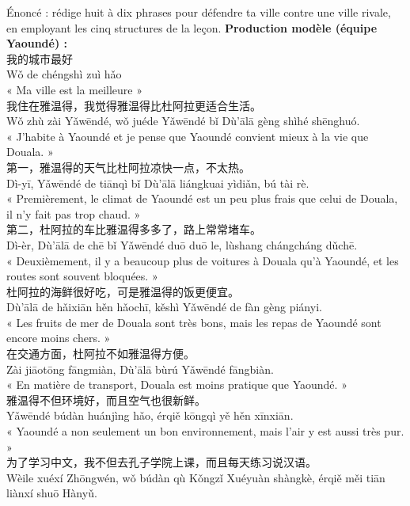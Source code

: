 \documentclass[11pt]{article}
\begin{document}
\begin{exoresolu}
Énoncé : rédige huit à dix phrases pour défendre ta ville contre une ville rivale, en employant les cinq structures de la leçon.
\tcblower
\textbf{Production modèle (équipe Yaoundé) :}\\[4pt]
我的城市最好\\
Wǒ de chéngshì zuì hǎo\\
« Ma ville est la meilleure »\\[4pt]
我住在雅温得，我觉得雅温得比杜阿拉更适合生活。\\
Wǒ zhù zài Yǎwēndé, wǒ juéde Yǎwēndé bǐ Dù'ālā gèng shìhé shēnghuó.\\
« J'habite à Yaoundé et je pense que Yaoundé convient mieux à la vie que Douala. »\\[4pt]
第一，雅温得的天气比杜阿拉凉快一点，不太热。\\
Dì-yī, Yǎwēndé de tiānqì bǐ Dù'ālā liángkuai yìdiǎn, bú tài rè.\\
« Premièrement, le climat de Yaoundé est un peu plus frais que celui de Douala, il n'y fait pas trop chaud. »\\[4pt]
第二，杜阿拉的车比雅温得多多了，路上常常堵车。\\
Dì-èr, Dù'ālā de chē bǐ Yǎwēndé duō duō le, lùshang chángcháng dǔchē.\\
« Deuxièmement, il y a beaucoup plus de voitures à Douala qu'à Yaoundé, et les routes sont souvent bloquées. »\\[4pt]
杜阿拉的海鲜很好吃，可是雅温得的饭更便宜。\\
Dù'ālā de hǎixiān hěn hǎochī, kěshì Yǎwēndé de fàn gèng piányi.\\
« Les fruits de mer de Douala sont très bons, mais les repas de Yaoundé sont encore moins chers. »\\[4pt]
在交通方面，杜阿拉不如雅温得方便。\\
Zài jiāotōng fāngmiàn, Dù'ālā bùrú Yǎwēndé fāngbiàn.\\
« En matière de transport, Douala est moins pratique que Yaoundé. »\\[4pt]
雅温得不但环境好，而且空气也很新鲜。\\
Yǎwēndé búdàn huánjìng hǎo, érqiě kōngqì yě hěn xīnxiān.\\
« Yaoundé a non seulement un bon environnement, mais l'air y est aussi très pur. »\\[4pt]
为了学习中文，我不但去孔子学院上课，而且每天练习说汉语。\\
Wèile xuéxí Zhōngwén, wǒ búdàn qù Kǒngzǐ Xuéyuàn shàngkè, érqiě měi tiān liànxí shuō Hànyǔ.\\

\end{exoresolu}
\end{document}
